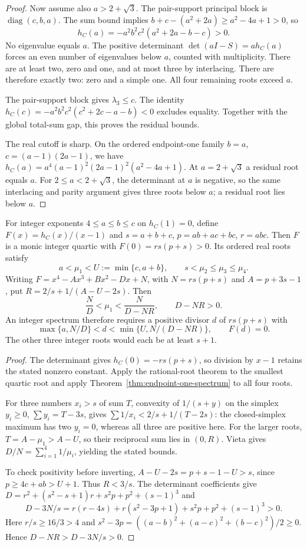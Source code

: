 \begin{proof}
Now assume also $a>2+\sqrt3$.
The pair-support principal block is $\operatorname{diag}(c,b,a)$.
The sum bound implies
$b+c-(a^2+2a)\geq a^2-4a+1>0$, so
\[
 h_C(a)=-a^2b^2c^2(a^2+2a-b-c)>0.
\]
No eigenvalue equals $a$. The positive determinant
$\det(aI-S)=a h_C(a)$ forces an even number of eigenvalues below
$a$, counted with multiplicity. There are at least two, zero and one,
and at most three by interlacing. There are therefore exactly two:
zero and a simple one. All four remaining roots exceed $a$.

The pair-support block gives $\lambda_3\leq c$. The identity
$h_C(c)=-a^2b^2c^2(c^2+2c-a-b)<0$ excludes equality.
Together with the global total-sum gap, this proves the residual bounds.

The real cutoff is sharp. On the ordered endpoint-one family
$b=a$, $c=(a-1)(2a-1)$, we have
$h_C(a)=a^4(a-1)^2(2a-1)^2(a^2-4a+1)$.
At $a=2+\sqrt3$ a residual root equals $a$. For $2\leq a<2+\sqrt3$,
the determinant at $a$ is negative, so the same interlacing and parity
argument gives three roots below $a$; a residual root lies below $a$.
\end{proof}

\begin{corollary}
\label{cor:endpoint-one-divisor-window}
For integer exponents $4\leq a\leq b\leq c$ on $h_C(1)=0$, define
$F(x)=h_C(x)/(x-1)$ and $s=a+b+c$, $p=ab+ac+bc$, $r=abc$.
Then $F$ is a monic integer quartic with $F(0)=rs(p+s)>0$.
Its ordered real roots satisfy
\[
 a<\mu_1<U:=\min\{c,a+b\},\qquad s<\mu_2\leq\mu_3\leq\mu_4.
\]
Writing $F=x^4-Ax^3+Bx^2-Dx+N$, with $N=rs(p+s)$ and
$A=p+3s-1$, put $R=2/s+1/(A-U-2s)$. Then
\[
 \frac ND<\mu_1<\frac{N}{D-NR},\qquad D-NR>0.
\]
An integer spectrum therefore requires a positive divisor $d$ of $rs(p+s)$ with
\[
 \max\{a,N/D\}<d<\min\{U,N/(D-NR)\},\qquad F(d)=0.
\]
The other three integer roots would each be at least $s+1$.
\end{corollary}
\begin{proof}
The determinant gives $h_C(0)=-rs(p+s)$, so division by $x-1$
retains the stated nonzero constant. Apply the rational-root theorem
to the smallest quartic root and apply Theorem~\ref{thm:endpoint-one-spectrum}
to all four roots.

For three numbers $x_i>s$ of sum $T$, convexity of $1/(s+y)$ on
the simplex $y_i\geq0$, $\sum y_i=T-3s$, gives
$\sum1/x_i<2/s+1/(T-2s)$: the closed-simplex maximum has two
$y_i=0$, whereas all three are positive here. For the larger roots,
$T=A-\mu_1>A-U$, so their reciprocal sum lies in $(0,R)$.
Vieta gives $D/N=\sum_{i=1}^4 1/\mu_i$, yielding the stated bounds.

To check positivity before inverting, $A-U-2s=p+s-1-U>s$, since
$p\geq4c+ab>U+1$. Thus $R<3/s$. The determinant coefficients give
$D=r^2+(s^2-s+1)r+s^2p+p^2+(s-1)^3$ and
\[
 D-3N/s=r(r-4s)+r(s^2-3p+1)+s^2p+p^2+(s-1)^3>0.
\]
Here $r/s\geq16/3>4$ and
$s^2-3p=((a-b)^2+(a-c)^2+(b-c)^2)/2\geq0$.
Hence $D-NR>D-3N/s>0$.
\end{proof}

